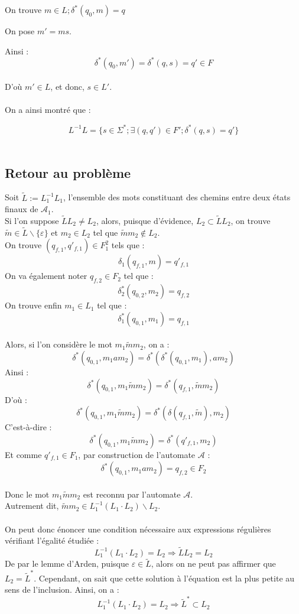\documentclass{article}
\begin{document}
On trouve $m \in L; \delta^*(q_0,m)=q$

On pose $m' = ms$.

Ainsi :
$$\delta^*(q_0,m') = \delta^*(q,s) = q' \in F$$
\\
D'où $m' \in L$, et donc, $s \in L'$.
\\
\\
On a ainsi montré que :

$$\boxed{L^{-1}L = \{ s \in \Sigma^* ; \exists (q,q') \in F' ; \delta^*(q,s) = q' \}}$$
\\

\subsection{Retour au problème}
Soit $\tilde{L} := L_1^{-1}L_1$, l'ensemble des mots constituant des chemins entre deux états finaux de $\mathcal{A}_1$.
\\
Si l'on suppose $\tilde{L}L_2 \neq L_2$, alors, puisque d'évidence, $L_2 \subset \tilde{L}L_2$, on trouve $\tilde{m} \in \tilde{L} \backslash \{\varepsilon\}$ et $m_2 \in L_2$ tel que $\tilde{m}m_2 \notin L_2$.
\\
On trouve $(q_{f,1},q'_{f,1}) \in F_1^2$ tels que :
$$\delta_1(q_{f,1},m)=q'_{f,1}$$
On va également noter $q_{f,2} \in F_2$ tel que :
$$\delta_2^*(q_{0,2},m_2) = q_{f,2}$$
On trouve enfin $m_1 \in L_1$ tel que :
$$\delta_1^*(q_{0,1},m_1) = q_{f,1}$$
\\
Alors, si l'on considère le mot $m_1\tilde{m}m_2$, on a :
$$\delta^*(q_{0,1},m_1am_2) = \delta^*(\delta^*(q_{0,1},m_1),am_2)$$
Ainsi :
$$\delta^*(q_{0,1},m_1\tilde{m}m_2) = \delta^*(q_{f,1},\tilde{m}m_2)$$
D'où :
$$\delta^*(q_{0,1},m_1\tilde{m}m_2) = \delta^*(\delta(q_{f,1},\tilde{m}),m_2)$$
C'est-à-dire :
$$\delta^*(q_{0,1},m_1\tilde{m}m_2) = \delta^*(q'_{f,1},m_2)$$
Et comme $q'_{f,1} \in F_1$, par construction de l'automate $\mathcal{A}$ :
$$\delta^*(q_{0,1},m_1am_2) = q_{f,2} \in F_2$$
\\
Donc le mot $m_1\tilde{m}m_2$ est reconnu par l'automate $\mathcal{A}$.
\\
Autrement dit, $\tilde{m}m_2 \in L_1^{-1}(L_1 \cdot L_2) \backslash L_2$.
\\
\\
On peut donc énoncer une condition nécessaire aux expressions régulières vérifiant l'égalité étudiée :
$$L_1^{-1}(L_1 \cdot L_2) = L_2 \Rightarrow \tilde{L}L_2 = L_2$$
De par le lemme d'Arden, puisque $\varepsilon \in \tilde{L}$, alors on ne peut pas affirmer que $L_2 = \tilde{L}^*$. Cependant, on sait que cette solution à l'équation est la plus petite au sens de l'inclusion. Ainsi, on a : 
$$L_1^{-1}(L_1\cdot L_2) = L_2 \Rightarrow \tilde{L}^* \subset L_2$$
\newpage
\end{document}

